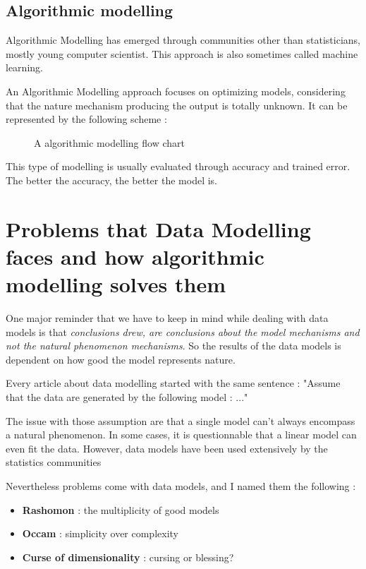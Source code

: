 \documentclass[a4paper,10pt]{article}
\begin{document}
\subsection{Algorithmic modelling}
Algorithmic Modelling has emerged through communities other than statisticians, mostly young computer scientist. This approach is also sometimes called machine learning.

An Algorithmic Modelling approach focuses on optimizing models, considering that the nature mechanism producing the output is totally unknown. It can be represented by the following scheme : 

\begin{figure}[!h]
  \caption{A algorithmic modelling flow chart}
  \label{Algorithmic Modelling}
  \centering
\end{figure}

This type of modelling is usually evaluated through accuracy and trained error. The better the accuracy, the better the model is.


\section{Problems that Data Modelling faces and how algorithmic modelling solves them}

One major reminder that we have to keep in mind while dealing with data models is that \emph{conclusions drew, are conclusions about the model mechanisms and not the natural phenomenon mechanisms}. So the results of the data models is dependent on how good the model represents nature.

Every article about data modelling started with the same sentence : "Assume that the data are generated by the following model : ..."

The issue with those assumption are that a single model can't always encompass a natural phenomenon. In some cases, it is questionnable that a linear model can even fit the data. However, data models have been used extensively by the statistics communities

Nevertheless problems come with data models, and I named them the following :

\begin{itemize}
\item \textbf{Rashomon} : the multiplicity of good models
\item \textbf{Occam} : simplicity over complexity
\item \textbf{Curse of dimensionality} : cursing or blessing?
\end{itemize}
\end{document}
